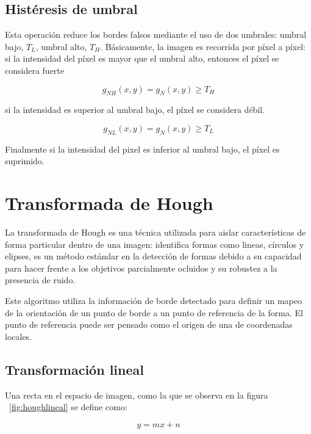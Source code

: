 \subsection{Histéresis de umbral}

Esta operación reduce los bordes falsos mediante el uso de dos umbrales: umbral bajo, $T_L$, umbral alto, $T_H$.
Básicamente, la imagen es recorrida por píxel a píxel: si la intensidad del píxel es mayor que el umbral alto, entonces
el píxel se considera fuerte

\begin{equation}
g_{NH}(x,y) = g_{N}(x,y)\geq T_H
\end{equation}

si la intensidad es superior al umbral bajo, el píxel se considera débil.  

\begin{equation}
g_{NL}(x,y) = g_{N}(x,y)\geq T_L
\end{equation}

Finalmente si la intensidad del pixel es inferior al umbral bajo, el píxel es suprimido.

\section{Transformada de Hough}


La transformada de Hough es una técnica utilizada para aislar características de forma particular dentro de una imagen:
identifica formas como lineas, círculos y elipses, es un método estándar en la detección de formas debido a su capacidad
para hacer frente a los objetivos parcialmente ocluidos y su robustez a la presencia de ruido\cite{Illingworth1988}.

Este algoritmo utiliza la información de borde detectado para definir un mapeo de la orientación de un punto de borde a
un punto de referencia de la forma. El punto de referencia puede ser pensado como el origen de una de coordenadas locales\cite{Ballard1987}.

\subsection{Transformación lineal}

Una recta en el espacio de imagen, como la que se observa en la figura ~\ref{fig:houghlineal} se define como:

\begin{equation}
y=mx+n
\end{equation}


